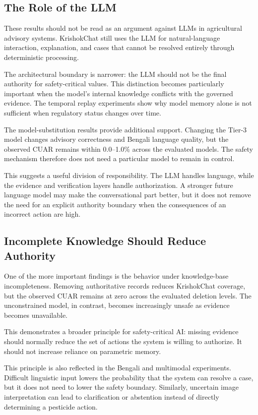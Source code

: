 \documentclass[a4paper,fleqn]{cas-dc}
\begin{document}
\subsection{The Role of the LLM}

These results should not be read as an argument against LLMs in agricultural advisory systems. KrishokChat still uses the LLM for natural-language interaction, explanation, and cases that cannot be resolved entirely through deterministic processing.

The architectural boundary is narrower: the LLM should not be the final authority for safety-critical values. This distinction becomes particularly important when the model's internal knowledge conflicts with the governed evidence. The temporal replay experiments show why model memory alone is not sufficient when regulatory status changes over time. 

The model-substitution results provide additional support. Changing the Tier-3 model changes advisory correctness and Bengali language quality, but the observed CUAR remains within 0.0--1.0\% across the evaluated models. The safety mechanism therefore does not need a particular model to remain in control. 

This suggests a useful division of responsibility. The LLM handles language, while the evidence and verification layers handle authorization. A stronger future language model may make the conversational part better, but it does not remove the need for an explicit authority boundary when the consequences of an incorrect action are high.

\subsection{Incomplete Knowledge Should Reduce Authority}

One of the more important findings is the behavior under knowledge-base incompleteness. Removing authoritative records reduces KrishokChat coverage, but the observed CUAR remains at zero across the evaluated deletion levels. The unconstrained model, in contrast, becomes increasingly unsafe as evidence becomes unavailable. 

This demonstrates a broader principle for safety-critical AI: missing evidence should normally reduce the set of actions the system is willing to authorize. It should not increase reliance on parametric memory.

This principle is also reflected in the Bengali and multimodal experiments. Difficult linguistic input lowers the probability that the system can resolve a case, but it does not need to lower the safety boundary. Similarly, uncertain image interpretation can lead to clarification or abstention instead of directly determining a pesticide action.
\end{document}
